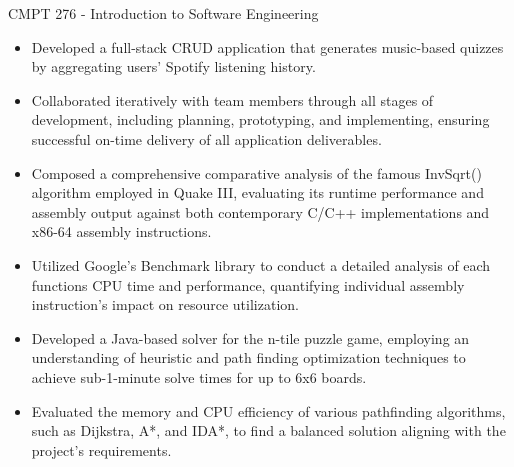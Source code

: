 \documentclass[10pt,a4paper,ragged2e,withhyper]{altacv}
\begin{document}
\begin{paracol}{2}
        \vspace{-2em}
             {CMPT 276 - Introduction to \medskip Software Engineering}
            \vspace{-0.5em}
            \begin{itemize}
            \item Developed a full-stack CRUD application that generates music-based quizzes by aggregating users’ Spotify listening history.
            \item Collaborated iteratively with team members through all stages of development, including planning, prototyping, and implementing, ensuring successful on-time delivery of all application deliverables.
            \end{itemize}
            \vspace{-0.5em}
            \divider
            \vspace{0.5em}
            \vspace{-0.5em}
            \begin{itemize}
            \item Composed a comprehensive comparative analysis of the famous InvSqrt() algorithm employed in Quake III, evaluating its runtime performance and assembly output against both contemporary C/C++ implementations and x86-64 assembly instructions.
            \item Utilized Google's Benchmark library to conduct a detailed analysis of each functions CPU time and performance, quantifying individual assembly instruction's impact on resource utilization.
            \end{itemize}
            \vspace{-0.5em}
            \divider
            \vspace{0.5em}
            \vspace{-0.5em}
            \begin{itemize}
            \item Developed a Java-based solver for the n-tile puzzle game, employing an understanding of heuristic and path finding optimization techniques to achieve sub-1-minute solve times for up to 6x6 boards.
            \item Evaluated the memory and CPU efficiency of various pathfinding algorithms, such as Dijkstra, A*, and IDA*, to find a balanced solution aligning with the project's requirements.
            \end{itemize}
        

\end{paracol}
\end{document}
